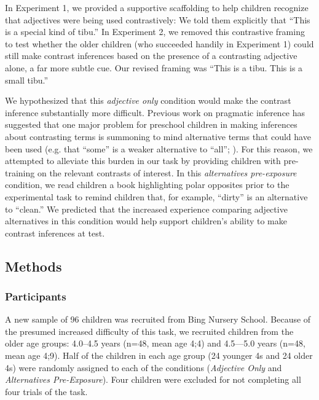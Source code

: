 \documentclass[man]{apa2}
\begin{document}

In Experiment 1, we provided a supportive scaffolding to help children recognize that adjectives were being used contrastively: We told them explicitly that ``This is a special kind of tibu.''  In Experiment 2, we removed this contrastive framing to test whether the older children (who succeeded handily in Experiment 1) could still make contrast inferences based on the presence of a contrasting adjective alone, a far more subtle cue. Our revised framing was ``This is a tibu. This is a small tibu.'' 

We hypothesized that this \emph{adjective only} condition would make the contrast inference substantially more difficult. Previous work on pragmatic inference has suggested that one major problem for preschool children in making inferences about contrasting terms is summoning to mind alternative terms that could have been used (e.g. that ``some'' is a weaker alternative to ``all''; ). For this reason, we attempted to alleviate this burden in our task by providing children with pre-training on the relevant contrasts of interest. In this \emph{alternatives pre-exposure} condition, we read children a book highlighting polar opposites prior to the experimental task to remind children that, for example, ``dirty'' is an alternative to ``clean.'' We predicted that the increased experience comparing adjective alternatives in this condition would help support children's ability to make contrast inferences at test.


\subsection{Methods}

\subsubsection{Participants}

A new sample of 96 children was recruited from Bing Nursery School.  Because of the presumed increased difficulty of this task, we recruited children from the older age groups: 4.0--4.5 years (n=48, mean age 4;4) and 4.5---5.0 years (n=48, mean age 4;9).  Half of the children in each age group (24 younger 4s and 24 older 4s) were randomly assigned to each of the conditions (\emph{Adjective Only} and \emph{Alternatives Pre-Exposure}). Four children were excluded for not completing all four trials of the task. 
\end{document}
